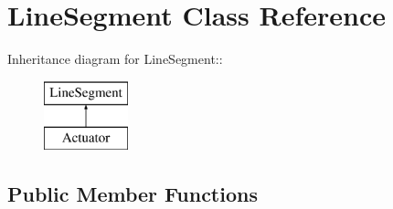 \hypertarget{class_line_segment}{
\section{LineSegment Class Reference}
\label{class_line_segment}
}
Inheritance diagram for LineSegment::\begin{figure}[H]
\begin{center}
\leavevmode
\includegraphics[height=2cm]{class_line_segment}
\end{center}
\end{figure}
\subsection*{Public Member Functions}
